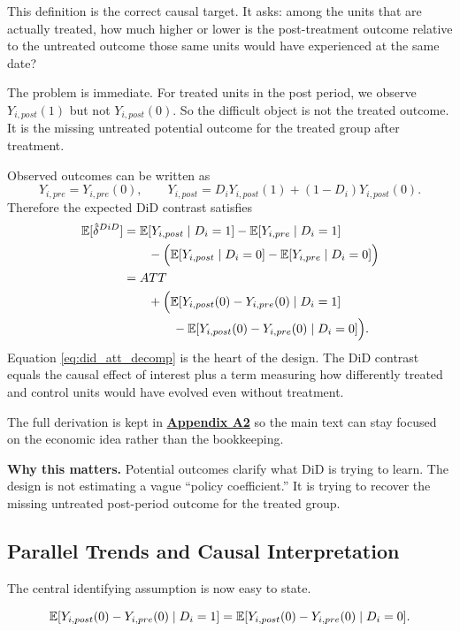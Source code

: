 This definition is the correct causal target. It asks: among the units that are actually treated, how much higher or lower is the post-treatment outcome relative to the untreated outcome those same units would have experienced at the same date?

The problem is immediate. For treated units in the post period, we observe $Y_{i,post}(1)$ but not $Y_{i,post}(0)$. So the difficult object is not the treated outcome. It is the missing untreated potential outcome for the treated group after treatment.

Observed outcomes can be written as
\[
Y_{i,pre}=Y_{i,pre}(0), \qquad
Y_{i,post}=D_iY_{i,post}(1)+(1-D_i)Y_{i,post}(0).
\]
Therefore the expected \ac{DiD} contrast satisfies
\begin{align}
\mathbb{E}[\hat{\delta}^{DiD}]
&=
\mathbb{E}[Y_{i,post}\mid D_i=1]-\mathbb{E}[Y_{i,pre}\mid D_i=1] \notag \\
&\qquad -\Big(\mathbb{E}[Y_{i,post}\mid D_i=0]-\mathbb{E}[Y_{i,pre}\mid D_i=0]\Big) \notag \\
&=
ATT \notag \\
&\qquad + \Big(\mathbb{E}[Y_{i,post}(0)-Y_{i,pre}(0)\mid D_i=1] \notag \\
&\qquad\qquad - \mathbb{E}[Y_{i,post}(0)-Y_{i,pre}(0)\mid D_i=0]\Big).
\label{eq:did_att_decomp}
\end{align}
Equation \eqref{eq:did_att_decomp} is the heart of the design. The \ac{DiD} contrast equals the causal effect of interest plus a term measuring how differently treated and control units would have evolved even without treatment.

The full derivation is kept in \hyperlink{app:did-att}{\textbf{Appendix A2}} so the main text can stay focused on the economic idea rather than the bookkeeping.

\begin{boxD}
\textbf{Why this matters.}
Potential outcomes clarify what \ac{DiD} is trying to learn. The design is not estimating a vague ``policy coefficient.'' It is trying to recover the missing untreated post-period outcome for the treated group.
\end{boxD}

\subsection{Parallel Trends and Causal Interpretation}
The central identifying assumption is now easy to state.

\begin{assN}
\begin{equation}
\mathbb{E}[Y_{i,post}(0)-Y_{i,pre}(0)\mid D_i=1]
=
\mathbb{E}[Y_{i,post}(0)-Y_{i,pre}(0)\mid D_i=0].
\label{eq:parallel_trends}
\end{equation}
\end{assN}

